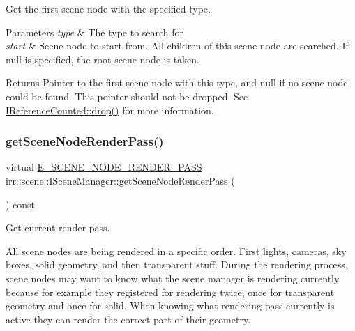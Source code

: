 Get the first scene node with the specified type. 


\begin{DoxyParams}{Parameters}
{\em type} & The type to search for \\
\hline
{\em start} & Scene node to start from. All children of this scene node are searched. If null is specified, the root scene node is taken. \\
\hline
\end{DoxyParams}
\begin{DoxyReturn}{Returns}
Pointer to the first scene node with this type, and null if no scene node could be found. This pointer should not be dropped. See \hyperlink{classirr_1_1IReferenceCounted_a03856a09355b89d178090c4a5f738543}{I\+Reference\+Counted\+::drop()} for more information. 
\end{DoxyReturn}
\mbox{\label{classirr_1_1scene_1_1ISceneManager_a2b8f844a1367d80648bc055a5639807b}} 
\subsubsection{\texorpdfstring{get\+Scene\+Node\+Render\+Pass()}{getSceneNodeRenderPass()}}
{\footnotesize\ttfamily virtual \hyperlink{namespaceirr_1_1scene_a7862269bd1abc123929d4dbb8200d67f}{E\+\_\+\+S\+C\+E\+N\+E\+\_\+\+N\+O\+D\+E\+\_\+\+R\+E\+N\+D\+E\+R\+\_\+\+P\+A\+SS} irr\+::scene\+::\+I\+Scene\+Manager\+::get\+Scene\+Node\+Render\+Pass (\begin{DoxyParamCaption}{ }\end{DoxyParamCaption}) const\hspace{0.3cm}{\ttfamily [pure virtual]}}



Get current render pass. 

All scene nodes are being rendered in a specific order. First lights, cameras, sky boxes, solid geometry, and then transparent stuff. During the rendering process, scene nodes may want to know what the scene manager is rendering currently, because for example they registered for rendering twice, once for transparent geometry and once for solid. When knowing what rendering pass currently is active they can render the correct part of their geometry. \mbox{\label{classirr_1_1scene_1_1ISceneManager_aa920cb095fc901273fd097a39ebc3255}} 
